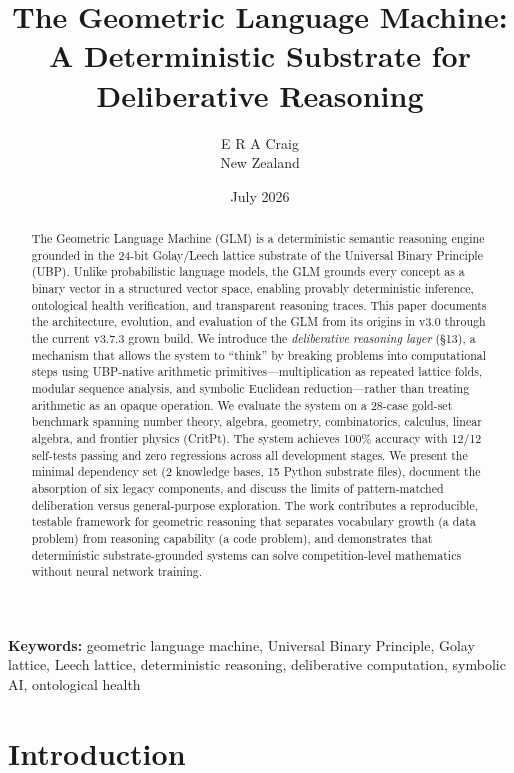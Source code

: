 \documentclass[11pt,a4paper]{article}
\title{The Geometric Language Machine: \\ A Deterministic Substrate for Deliberative Reasoning}
\author{E R A Craig \\ \small New Zealand}
\date{July 2026}
\begin{document}
\maketitle

\begin{abstract}
The Geometric Language Machine (GLM) is a deterministic semantic reasoning engine grounded in the 24-bit Golay/Leech lattice substrate of the Universal Binary Principle (UBP). Unlike probabilistic language models, the GLM grounds every concept as a binary vector in a structured vector space, enabling provably deterministic inference, ontological health verification, and transparent reasoning traces. This paper documents the architecture, evolution, and evaluation of the GLM from its origins in v3.0 through the current v3.7.3 grown build. We introduce the \emph{deliberative reasoning layer} (\S13), a mechanism that allows the system to ``think'' by breaking problems into computational steps using UBP-native arithmetic primitives---multiplication as repeated lattice folds, modular sequence analysis, and symbolic Euclidean reduction---rather than treating arithmetic as an opaque operation. We evaluate the system on a 28-case gold-set benchmark spanning number theory, algebra, geometry, combinatorics, calculus, linear algebra, and frontier physics (CritPt). The system achieves 100\% accuracy with 12/12 self-tests passing and zero regressions across all development stages. We present the minimal dependency set (2 knowledge bases, 15 Python substrate files), document the absorption of six legacy components, and discuss the limits of pattern-matched deliberation versus general-purpose exploration. The work contributes a reproducible, testable framework for geometric reasoning that separates vocabulary growth (a data problem) from reasoning capability (a code problem), and demonstrates that deterministic substrate-grounded systems can solve competition-level mathematics without neural network training.
\end{abstract}

\noindent\textbf{Keywords:} geometric language machine, Universal Binary Principle, Golay lattice, Leech lattice, deterministic reasoning, deliberative computation, symbolic AI, ontological health

\vspace{1em}

\section{Introduction}
\end{document}
